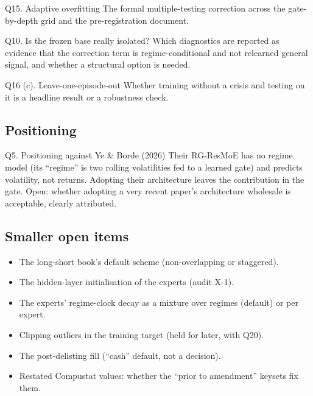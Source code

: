 \begin{openbox}{Q15. Adaptive overfitting}
The formal multiple-testing correction across the gate-by-depth grid and the pre-registration document.
\end{openbox}

\begin{openbox}{Q10. Is the frozen base really isolated?}
Which diagnostics are reported as evidence that the correction term is regime-conditional and not
relearned general signal, and whether a structural option is needed.
\end{openbox}

\begin{openbox}{Q16 (c). Leave-one-episode-out}
Whether training without a crisis and testing on it is a headline result or a robustness check.
\end{openbox}

\subsection{Positioning}

\begin{openbox}{Q5. Positioning against Ye \& Borde (2026)}
Their RG-ResMoE has no regime model (its ``regime'' is two rolling volatilities fed to a learned gate)
and predicts volatility, not returns. Adopting their architecture leaves the contribution in the gate.
Open: whether adopting a very recent paper's architecture wholesale is acceptable, clearly attributed.
\end{openbox}

\subsection{Smaller open items}

\begin{itemize}
\item The long-short book's default scheme (non-overlapping or staggered).
\item The hidden-layer initialisation of the experts (audit X-1).
\item The experts' regime-clock decay as a mixture over regimes (default) or per expert.
\item Clipping outliers in the training target (held for later, with Q20).
\item The post-delisting fill (``cash'' default, not a decision).
\item Restated Compustat values: whether the ``prior to amendment'' keysets fix them.
\end{itemize}

